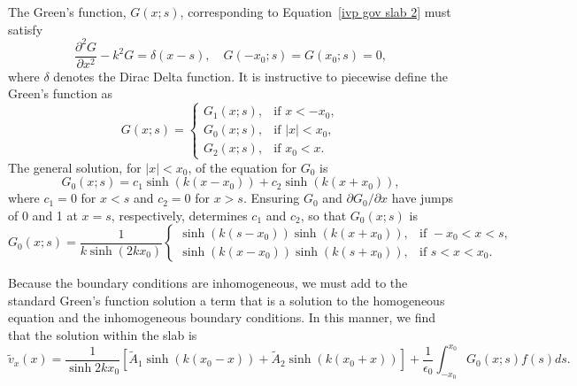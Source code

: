\documentclass{aastex61}
\begin{document}
The Green's function, $G(x;s)$, corresponding to Equation~\eqref{ivp gov slab 2} must satisfy 
\begin{equation}
\frac{\partial^2G}{\partial x^2} - k^2 G = \delta(x-s), \quad G(-x_0;s) = G(x_0;s) = 0,
\end{equation}
where $\delta$ denotes the Dirac Delta function. It is instructive to piecewise define the Green's function as
\begin{equation}
G(x;s) = 
\begin{cases}
G_1(x;s), & \text{if } x < -x_0, \\
G_0(x;s), & \text{if } |x| < x_0, \\
G_2(x;s), & \text{if } x_0 < x.
\end{cases}
\end{equation}
The general solution, for $|x| < x_0$, of the equation for $G_0$ is
\begin{equation}
G_0(x;s) = c_1\sinh(k(x - x_0)) + c_2\sinh(k(x + x_0)),
\end{equation}
where $c_1 = 0$ for $x < s$ and $c_2 = 0$ for $x > s$. Ensuring $G_0$ and $\partial G_0 / \partial x$ have jumps of 0 and 1 at $x = s$, respectively, determines $c_1$ and $c_2$, so that $G_0(x;s)$ is
\begin{equation}
G_0(x;s) = \frac{1}{k\sinh(2k x_0)}
\begin{cases}
\sinh(k(s - x_0))\sinh(k(x + x_0)), & \text{if } -x_0<x<s, \\
\sinh(k(x - x_0))\sinh(k(s + x_0)), & \text{if } s<x<x_0.
\end{cases}
\end{equation}

Because the boundary conditions are inhomogeneous, we must add to the standard Green's function solution a term that is a solution to the homogeneous equation and the inhomogeneous boundary conditions. In this manner, we find that the solution within the slab is
\begin{equation}
\tilde{v}_x(x) = \frac{1}{\sinh{2kx_0}} \left[ \tilde{A}_1\sinh(k(x_0 - x)) + \tilde{A}_2\sinh(k(x_0 + x)) \right] + \frac{1}{\epsilon_0}\int_{-x_0}^{x_0} G_0(x;s) f(s) ds.
\end{equation}
\end{document}
